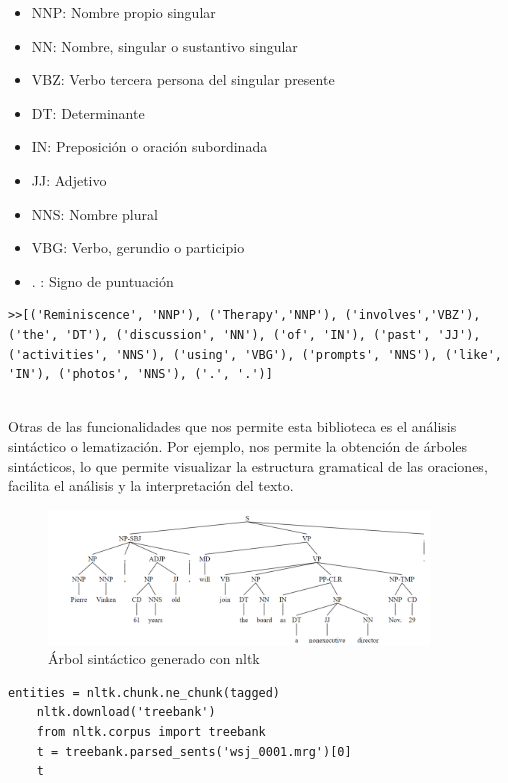 \begin{itemize}
	\item NNP: Nombre propio singular
	\item NN: Nombre, singular o sustantivo singular
	\item VBZ: Verbo tercera persona del singular presente
	\item DT: Determinante
	\item IN: Preposición o oración subordinada
	\item JJ: Adjetivo
	\item NNS: Nombre plural 
	\item VBG: Verbo, gerundio o participio
	\item . : Signo de puntuación
\end{itemize}

\begin{lstlisting}[style=SpyderStyle, caption={Tokenización y etiquetado con nltk}, captionpos=b, label={lst:python},breaklines = true]
	>>[('Reminiscence', 'NNP'), ('Therapy','NNP'), ('involves','VBZ'), ('the', 'DT'), ('discussion', 'NN'), ('of', 'IN'), ('past', 'JJ'), ('activities', 'NNS'), ('using', 'VBG'), ('prompts', 'NNS'), ('like', 'IN'), ('photos', 'NNS'), ('.', '.')]
	
\end{lstlisting}

Otras de las funcionalidades que nos permite esta biblioteca es el análisis sintáctico o lematización. Por ejemplo, nos permite la obtención de árboles sintácticos, lo que permite visualizar la estructura gramatical de las oraciones, facilita el análisis y la interpretación del texto. \\

\begin{figure}[h]
	\centering
	\includegraphics[width=0.9\textwidth]{Imagenes/arbolsintactico}
	\caption{Árbol sintáctico generado con nltk}
	\label{fig:2}
\end{figure}

\begin{lstlisting}[style=SpyderStyle, caption={Análisis sintáctico y lematización con nltk}, captionpos=b, label={lst:python},breaklines = true]
	entities = nltk.chunk.ne_chunk(tagged)
	nltk.download('treebank')
	from nltk.corpus import treebank
	t = treebank.parsed_sents('wsj_0001.mrg')[0]
	t
\end{lstlisting}


